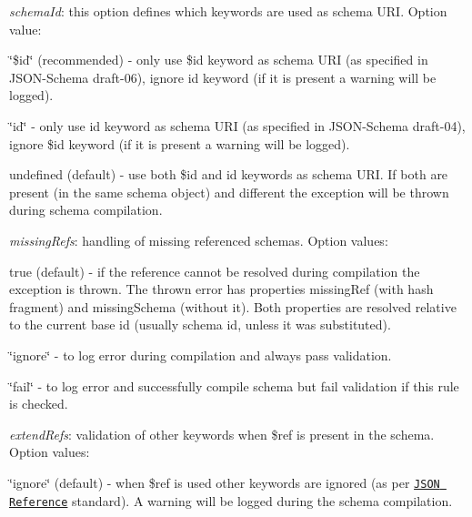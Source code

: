 \begin{DoxyItemize}
\item {\itshape schema\+Id}\+: this option defines which keywords are used as schema U\+RI. Option value\+:
\begin{DoxyItemize}
\item {\ttfamily \char`\"{}\$id\char`\"{}} (recommended) -\/ only use {\ttfamily \$id} keyword as schema U\+RI (as specified in J\+S\+O\+N-\/\+Schema draft-\/06), ignore {\ttfamily id} keyword (if it is present a warning will be logged).
\item {\ttfamily \char`\"{}id\char`\"{}} -\/ only use {\ttfamily id} keyword as schema U\+RI (as specified in J\+S\+O\+N-\/\+Schema draft-\/04), ignore {\ttfamily \$id} keyword (if it is present a warning will be logged).
\item {\ttfamily undefined} (default) -\/ use both {\ttfamily \$id} and {\ttfamily id} keywords as schema U\+RI. If both are present (in the same schema object) and different the exception will be thrown during schema compilation.
\end{DoxyItemize}
\item {\itshape missing\+Refs}\+: handling of missing referenced schemas. Option values\+:
\begin{DoxyItemize}
\item {\ttfamily true} (default) -\/ if the reference cannot be resolved during compilation the exception is thrown. The thrown error has properties {\ttfamily missing\+Ref} (with hash fragment) and {\ttfamily missing\+Schema} (without it). Both properties are resolved relative to the current base id (usually schema id, unless it was substituted).
\item {\ttfamily \char`\"{}ignore\char`\"{}} -\/ to log error during compilation and always pass validation.
\item {\ttfamily \char`\"{}fail\char`\"{}} -\/ to log error and successfully compile schema but fail validation if this rule is checked.
\end{DoxyItemize}
\item {\itshape extend\+Refs}\+: validation of other keywords when {\ttfamily \$ref} is present in the schema. Option values\+:
\begin{DoxyItemize}
\item {\ttfamily \char`\"{}ignore\char`\"{}} (default) -\/ when {\ttfamily \$ref} is used other keywords are ignored (as per \href{https://tools.ietf.org/html/draft-pbryan-zyp-json-ref-03#section-3}{\tt J\+S\+ON Reference} standard). A warning will be logged during the schema compilation.

\end{DoxyItemize}
\end{DoxyItemize}
